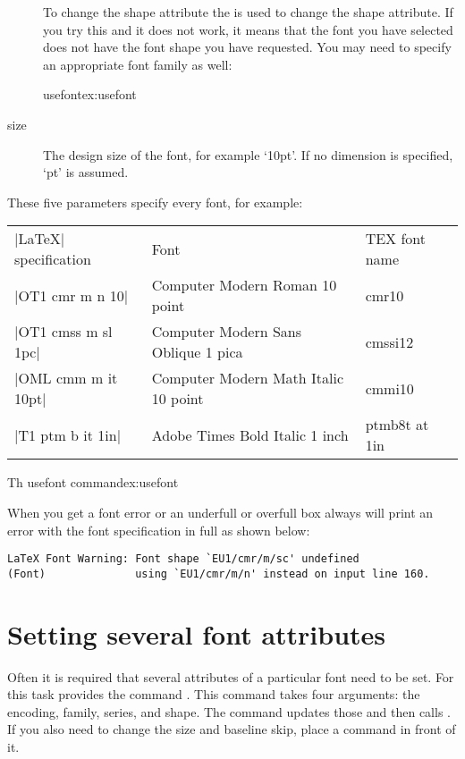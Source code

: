 \begin{description}
To change the shape attribute the  is used to change the shape
attribute. If you try this and it does not work, it means that the font you have selected
does not have the font shape you have requested. You may need to specify an appropriate
font family as well:

\begin{texexample}{usefont}{ex:usefont}
{  \raggedright \lorem}
\end{texexample}

\item[size] The design size of the font, for example `10pt'. If no dimension is specified, `pt' is assumed.
\end{description}

These five parameters specify every \latex
font, for example:

\begin{longtable}{lll}
|LaTeX| specification &Font  &TEX font name\\
|OT1 cmr m n 10|      &Computer Modern Roman 10 point &cmr10\\
|OT1 cmss m sl 1pc|   &Computer Modern Sans Oblique 1 pica &cmssi12\\
|OML cmm m it 10pt|   &Computer Modern Math Italic 10 point &cmmi10\\
|T1 ptm b it 1in|  &Adobe Times Bold Italic 1 inch &ptmb8t at 1in\\
\end{longtable}

\begin{texexample}{Th usefont command}{ex:usefont}
\bgroup
\fontsize{12}{14pt} \lorem
\lorem
\egroup
\end{texexample}

When you get a font error or an underfull or overfull box \tex always will print an error with the font specification in full as shown below:

\begin{verbatim}
LaTeX Font Warning: Font shape `EU1/cmr/m/sc' undefined
(Font)              using `EU1/cmr/m/n' instead on input line 160.
\end{verbatim}

\section{Setting several font attributes}

Often it is required that several attributes of a particular font need to be set. For this
task \latex provides the command . This command takes four arguments: the encoding, family, series, and shape. The command updates those and then calls . If you also need to change the size and baseline skip, place
a  command in front of it. 

